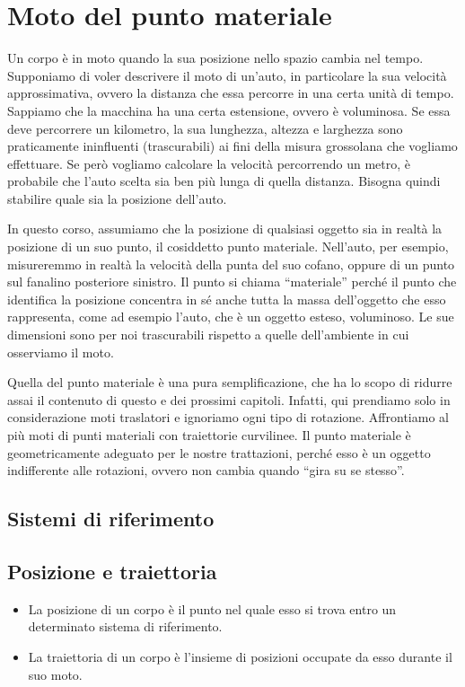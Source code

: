 \marginpar{\minitoc}

\section{Moto del punto materiale}
Un corpo è in moto quando la sua posizione nello spazio cambia nel tempo.
Supponiamo di voler descrivere il moto di un'auto, in particolare la sua
velocità approssimativa, ovvero la distanza che essa percorre in una certa unità di
tempo. Sappiamo che la macchina ha una certa estensione, ovvero è
voluminosa. Se essa deve percorrere un kilometro, la sua lunghezza,
altezza e larghezza sono praticamente ininfluenti (trascurabili) ai fini della misura
grossolana che vogliamo effettuare. Se però vogliamo calcolare la velocità
percorrendo un metro, è probabile che l'auto scelta sia ben più lunga
di quella distanza. Bisogna quindi stabilire quale sia la posizione
dell'auto.

In questo corso, assumiamo che la posizione di qualsiasi oggetto sia
in realtà la posizione di un suo punto, il cosiddetto punto materiale.
Nell'auto, per esempio, misureremmo in realtà la velocità della punta
del suo cofano, oppure di un punto sul fanalino posteriore sinistro.
Il punto si chiama ``materiale'' perché il punto che identifica la
posizione concentra in sé anche tutta la massa dell'oggetto che esso
rappresenta, come ad esempio l'auto, che è un oggetto esteso,
voluminoso. Le sue dimensioni sono per noi trascurabili rispetto
a quelle dell'ambiente in cui osserviamo il moto.

Quella del punto materiale è una pura semplificazione, che ha lo scopo
di ridurre assai il contenuto di questo e dei prossimi capitoli.
Infatti, qui prendiamo solo in considerazione moti traslatori e ignoriamo
ogni tipo di rotazione. Affrontiamo al più moti di punti materiali
con traiettorie curvilinee. Il punto materiale è geometricamente adeguato
per le nostre trattazioni, perché esso è un oggetto indifferente alle
rotazioni, ovvero non cambia quando ``gira su se stesso''.

\subsection{Sistemi di riferimento}

\subsection{Posizione e traiettoria}
\begin{tcolorbox}[colback = yellow!30, colframe = yellow!30!black, title = {Posizione e traiettoria}]
\begin{itemize}
    \item La posizione di un corpo è il punto nel quale esso si trova entro un
    determinato sistema di riferimento.

    \item La traiettoria di un corpo è l'insieme di posizioni occupate da esso
    durante il suo moto.
\end{itemize}
\end{tcolorbox}


